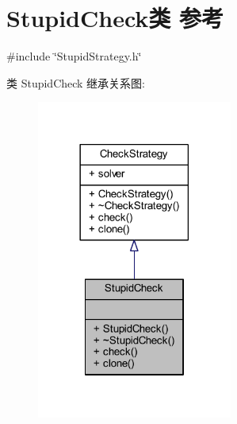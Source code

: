 \hypertarget{classStupidCheck}{}\section{Stupid\+Check类 参考}
\label{classStupidCheck}


{\ttfamily \#include \char`\"{}Stupid\+Strategy.\+h\char`\"{}}



类 Stupid\+Check 继承关系图\+:
\nopagebreak
\begin{figure}[H]
\begin{center}
\leavevmode
\includegraphics[width=182pt]{classStupidCheck__inherit__graph}
\end{center}
\end{figure}


